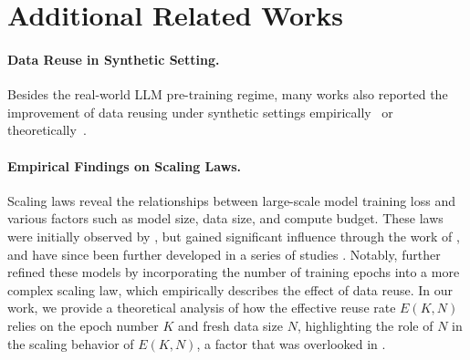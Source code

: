\section{Additional Related Works}
\paragraph{Data Reuse in Synthetic Setting.} Besides the real-world LLM pre-training regime, many works also reported the improvement of data reusing under synthetic settings empirically~\citep{charton2024emergent,kazdan2024collapse} or theoretically~\citep{zucchet2025emergence,dandi2024benefitsreusingbatchesgradient,arnaboldi2025repetitaiuvantdatarepetition}. 

\paragraph{Empirical Findings on Scaling Laws.} Scaling laws reveal the relationships between large-scale model training loss and various factors such as model size, data size, and compute budget. These laws were initially observed by \citet{hestness2017deep}, but gained significant influence through the work of \citet{kaplan2020scaling}, and have since been further developed in a series of studies \citep{henighan2020scaling, hoffmann2022training, zhai2022scaling, kadra2023power, aghajanyan2023scaling, muennighoff2023scaling, bi2024deepseek, shuai2024scaling, kumar2024scaling, tissue2024scaling, luo2025multi}. %
Notably, \citet{muennighoff2023scaling} further refined these models by incorporating the number of training epochs into a more complex scaling law, which empirically describes the effect of data reuse. In our work, we provide a theoretical analysis of how the effective reuse rate $E(K,N)$ relies on the epoch number $K$ and fresh data size $N$, highlighting the role of $N$ in the scaling behavior of $E(K,N)$, a factor that was overlooked in \citet{muennighoff2023scaling}. 

